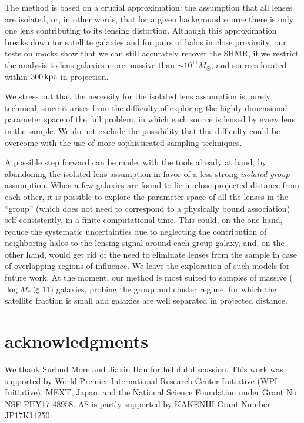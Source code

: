 \documentclass[usenatbib]{mnras}
\def\mstar{M_*}
\begin{document}
The method is based on a crucial approximation: the assumption that all lenses are isolated, or, in other words, that for a given background source there is only one lens contributing to its lensing distortion.
Although this approximation breaks down for satellite galaxies and for pairs of halos in close proximity, our tests on mocks show that we can still accurately recover the SHMR, if we restrict the analysis to lens galaxies more massive than $\sim10^{11}M_\odot$, and sources located within $300\,\rm{kpc}$ in projection.

We stress out that the necessity for the isolated lens assumption is purely technical, since it arises from the difficulty of exploring the highly-dimensional parameter space of the full problem, in which each source is lensed by every lens in the sample.
We do not exclude the possibility that this difficulty could be overcome with the use of more sophisticated sampling techniques.

A possible step forward can be made, with the tools already at hand, by abandoning the isolated lens assumption in favor of a less strong {\em isolated group} assumption. When a few galaxies are found to lie in close projected distance from each other, it is possible to explore the parameter space of all the lenses in the ``group'' (which does not need to correspond to a physically bound association) self-consistently, in a finite computational time.
This could, on the one hand, reduce the systematic uncertainties due to neglecting the contribution of neighboring halos to the lensing signal around each group galaxy, and, on the other hand, would get rid of the need to eliminate lenses from the sample in case of overlapping regions of influence.
We leave the exploration of such models for future work.
At the moment, our method is most suited to samples of massive ($\log{\mstar} \gtrsim 11$) galaxies, probing the group and cluster regime, for which the satellite fraction is small and galaxies are well separated in projected distance.


\section*{acknowledgments}
We thank Surhud More and Jiaxin Han for helpful discussion.
This work was supported by World Premier International Research Center Initiative (WPI Initiative), MEXT, Japan, and the National Science Foundation under Grant No. NSF PHY17-48958.
AS is partly supported by KAKENHI Grant Number JP17K14250. 


\end{document}
